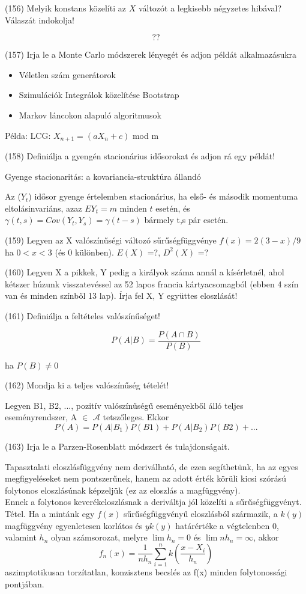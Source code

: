 \documentclass[12p]{article}
\begin{document}
(156) Melyik konstans közelíti az $X$ változót a legkisebb négyzetes hibával? Válaszát indokolja!

$$??$$

(157)  Irja le a Monte Carlo módszerek lényegét és adjon példát alkalmazásukra

\begin{itemize}
	\item Véletlen szám generátorok
	\item Szimulációk
	\subitem Integrálok közelítése
	\subitem Bootstrap
	\item Markov láncokon alapuló algoritmusok
\end{itemize}

Példa: LCG: $X_{n+1} = (aX_n + c)$ mod m

(158) Definiálja a gyengén stacionárius idősorokat és adjon rá egy példát!

Gyenge stacionaritás: a kovariancia-struktúra állandó

Az ($Y_t$) idősor gyenge értelemben stacionárius, ha első- és második momentuma eltolásinvariáns, azaz $EY_t = m$ minden $t$ esetén, és $\gamma(t,s) = Cov(Y_t, Y_s) = \gamma(t - s)$ bármely t,s pár esetén.

(159) Legyen az X valószínűségi változó sűrűségfüggvénye $f(x) = 2(3 - x)/9$ ha $0 < x < 3$ (és 0 különben). $E(X)$ =?, $D^2(X)$ =? 

(160) Legyen X a pikkek, Y pedig a királyok száma annál a kísérletnél, ahol kétszer húzunk
visszatevéssel az 52 lapos francia kártyacsomagból (ebben 4 szín van és minden színből 13
lap). Írja fel X, Y együttes eloszlását!

(161) Definiálja a feltételes valószínűséget!

$$P(A|B) = \frac{P(A \cap B)}{P(B)}$$

ha $P(B) \neq 0$

(162) Mondja ki a teljes valószínűség tételét!

Legyen B1, B2, ..., pozitív valószínűségű eseményekből álló teljes eseményrendszer, A $\in$ $\mathscr{A}$ tetszőleges. Ekkor
$$P(A) = P(A|B_1)P(B1)+P(A|B_2)P(B2)+ ...$$


(163) Irja le a Parzen-Rosenblatt módszert és tulajdonságait.

Tapasztalati eloszlásfüggvény nem deriválható, de ezen segíthetünk, ha az egyes megfigyeléseket nem pontszerűnek, hanem az adott érték körüli kicsi szórású folytonos eloszlásúnak képzeljük (ez az eloszlás a magfüggvény).\\
Ennek a folytonos keverékeloszlásnak a deriváltja jól közelíti a sűrűségfüggvényt.\\
Tétel. Ha a mintánk egy $f(x)$ sűrűségfüggvényű
eloszlásból származik, a $k(y)$ magfüggvény
egyenletesen korlátos és $yk(y)$ határértéke a
végtelenben 0, valamint $h_n$ olyan számsorozat,
melyre $\lim h_n = 0$ és $\lim nh_n = \infty$, akkor
$$f_n(x) = \frac{1}{nh_n} \sum^{n}_{i=1}k\left(\frac{x-X_i}{h_n}\right)$$ 
aszimptotikusan torzítatlan, konzisztens becslés az f(x) minden folytonossági pontjában.
\end{document}

